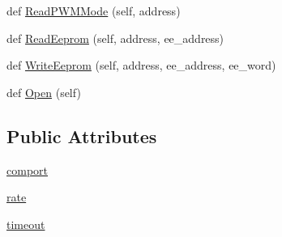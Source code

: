 \begin{DoxyCompactItemize}
\item 
def \mbox{\hyperlink{classtoxic__hardware_1_1roboclaw__3_1_1Roboclaw_a57da6f3e34a97060746c1146231c0e12}{Read\+P\+W\+M\+Mode}} (self, address)
\item 
def \mbox{\hyperlink{classtoxic__hardware_1_1roboclaw__3_1_1Roboclaw_af0b73281534befe652ee9c8d1e5369d6}{Read\+Eeprom}} (self, address, ee\+\_\+address)
\item 
def \mbox{\hyperlink{classtoxic__hardware_1_1roboclaw__3_1_1Roboclaw_a2682f7ef9027b31c259024be424d9f7a}{Write\+Eeprom}} (self, address, ee\+\_\+address, ee\+\_\+word)
\item 
def \mbox{\hyperlink{classtoxic__hardware_1_1roboclaw__3_1_1Roboclaw_a5da54dc661c4be70932cdc510cb09daf}{Open}} (self)
\end{DoxyCompactItemize}
\subsection*{Public Attributes}
\begin{DoxyCompactItemize}
\item 
\mbox{\hyperlink{classtoxic__hardware_1_1roboclaw__3_1_1Roboclaw_afe709148cc406a6e0792a3acd68de50e}{comport}}
\item 
\mbox{\hyperlink{classtoxic__hardware_1_1roboclaw__3_1_1Roboclaw_a823cdc6a792969a1c38973ef9b5fc1b4}{rate}}
\item 
\mbox{\hyperlink{classtoxic__hardware_1_1roboclaw__3_1_1Roboclaw_a67cef4a084cee785a5dd2c81e51acb70}{timeout}}
\end{DoxyCompactItemize}
